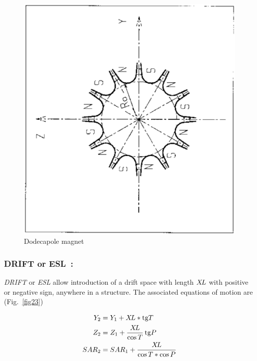 \begin{figure}[H]
\centerline{\includegraphics[width=12cm,angle=-90]{Fig19.ps}}
\caption{\label{fig19}Dodecapole magnet}
\end{figure}
\vfill

\newpage
\subsubsection*{DRIFT or ESL~: \DRIFTTitl}\label{ESL}\label{DRIFT}
\medskip

\textsl{DRIFT} or \textsl{ESL} allow introduction of a drift space with length $ X\!L $ with 
positive or negative sign, anywhere in a structure.  The associated equations 
of motion are (Fig.~\ref{fig23})   

\begin{align*}
	Y_2 &   =    Y_1+X\!L \ast \text{tg} T  \\ 
	Z_2 &   =   Z_1 + \dfrac{X\!L}{\cos  T}\,  \text{tg} P  \\
	SAR_2 &   =  SAR_1+ \dfrac{X\!L }{\cos  T  \ast \cos  P}  
\end{align*}
\vfill


